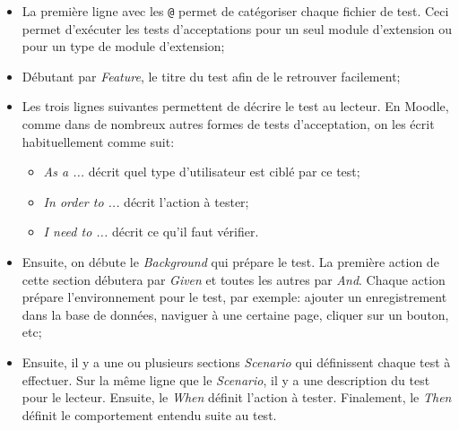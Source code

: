 \begin{itemize}
  \item La première ligne avec les \verb|@| permet de catégoriser chaque fichier de test.
        Ceci permet d'exécuter les tests d'acceptations pour un seul module d'extension ou pour un type de module d'extension;
        
  \item Débutant par \textit{Feature}, le titre du test afin de le retrouver facilement;
  
  \item Les trois lignes suivantes permettent de décrire le test au lecteur.
        En Moodle, comme dans de nombreux autres formes de tests d'acceptation, on les écrit habituellement comme suit:
        
        \begin{itemize}
          \item \og \textit{As a ...} \fg{} décrit quel type d'utilisateur est ciblé par ce test;
          \item \og \textit{In order to ...} \fg{} décrit l'action à tester;
          \item \og \textit{I need to ...} \fg{} décrit ce qu'il faut vérifier.
        \end{itemize}
        
  \item Ensuite, on débute le \textit{Background} qui prépare le test.
        La première action de cette section débutera par \textit{Given} et toutes les autres par \textit{And}.
        Chaque action prépare l'environnement pour le test, par exemple: ajouter un enregistrement dans la base de données, naviguer à une certaine page, cliquer sur un bouton, etc;
        
  \item Ensuite, il y a une ou plusieurs sections \textit{Scenario} qui définissent chaque test à effectuer.
        Sur la même ligne que le \textit{Scenario}, il y a une description du test pour le lecteur.
        Ensuite, le \textit{When} définit l'action à tester.
        Finalement, le \textit{Then} définit le comportement entendu suite au test.
\end{itemize}

